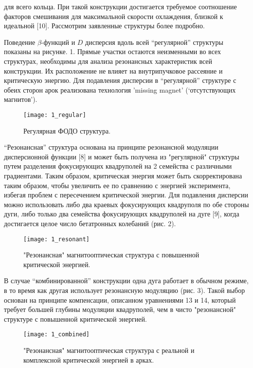 \noindent для всего кольца. При такой конструкции достигается требуемое соотношение факторов смешивания для максимальной скорости охлаждения, близкой к идеальной [10]. Рассмотрим заявленные структуры более подробно.

\noindent Поведение $\beta$-функций и $D$ дисперсия вдоль всей “регулярной” структуры показаны на рисунке. 1. Прямые участки остаются неизменными во всех структурах, необходимы для анализа резонансных характеристик всей конструкции. Их расположение не влияет на внутрипучковое рассеяние и критическую энергию. Для подавления дисперсии в “регулярной” структуре с обеих сторон арок реализована технология 'missing magnet' (‘отсутствующих магнитов’).

\begin{figure}[!h]
  \centering
   \texttt{[image: 1\_regular]}
   \caption{Регулярная ФОДО структура.}
   \label{fig:1_regular}
\end{figure}

\noindent “Резонансная” структура основана на принципе резонансной модуляции дисперсионной функции [8] и может быть получена из "регулярной" структуры путем разделения фокусирующих квадруполей на 2 семейства с различными градиентами. Таким образом, критическая энергия может быть скорректирована таким образом, чтобы увеличить ее по сравнению с энергией эксперимента, избегая проблем с пересечением критической энергии. Для подавления дисперсии можно использовать либо два краевых фокусирующих квадруполя по обе стороны дуги, либо только два семейства фокусирующих квадруполей на дуге [9], когда достигается целое число бетатронных колебаний (рис. 2).

\begin{figure}[!h]
  \centering
   \texttt{[image: 1\_resonant]}
   \caption{"Резонансная" магнитооптическая структура с повышенной критической энергией.}
   \label{fig:1_resonant}
\end{figure}

\noindent В случае “комбинированной” конструкции одна дуга работает в обычном режиме, в то время как другая использует резонансную модуляцию (рис. 3). Такой выбор основан на принципе компенсации, описанном уравнениями 13 и 14, который требует большей глубины модуляции квадруполей, чем в чисто "резонансной" структуре с повышенной критической энергией.

\begin{figure}[!h]
  \centering
   \texttt{[image: 1\_combined]}
   \caption{"Резонансная" магнитооптическая структура с реальной и комплексной критической энергией в арках.}
   \label{fig:1_combined}
\end{figure}


